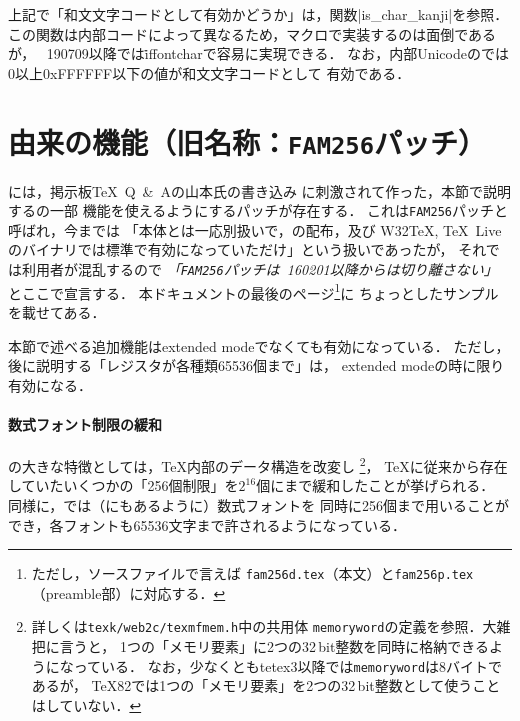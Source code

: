 \documentclass[a4paper,11pt,nomag,dvipdfmx]{jsarticle}
\begin{document}
\begin{dangerous}
  上記で「和文文字コードとして有効かどうか」は，関数|is_char_kanji|を参照．
  この関数は内部コードによって異なるため，マクロで実装するのは面倒であるが，
  \epTeX~190709以降では\.{iffontchar}で容易に実現できる．
  なお，内部Unicodeの\upTeX では0以上0xFFFFFF以下の値が和文文字コードとして
  有効である．%
\end{dangerous}


\section{\OMEGA 由来の機能（旧名称：\texttt{FAM256}パッチ）}
\epTeX には，掲示板\TeX\ Q\ \&\ Aの山本氏の書き込み
\cite{yamamoto}に刺激されて作った，本節で説明する\OMEGA の一部
機能を使えるようにするパッチが存在する．
これは\texttt{FAM256}パッチと呼ばれ，今までは
「\epTeX 本体とは一応別扱いで，\epTeX の配布，及び
W32\TeX, \TeX~Liveのバイナリでは標準で有効になっていただけ」という扱いであったが，
それでは利用者が混乱するので
\emph{「\texttt{FAM256}パッチは\epTeX~160201以降からは切り離さない」}
とここで宣言する．
本ドキュメントの最後のページ\footnote{ただし，ソースファイルで言えば
\texttt{fam256d.tex}（本文）と\texttt{fam256p.tex}（preamble部）に対応する．}に
ちょっとしたサンプルを載せてある．

本節で述べる追加機能はextended modeでなくても有効になっている．
ただし，後に説明する「レジスタが各種類65536個まで」は，
extended modeの時に限り有効になる．

\paragraph{数式フォント制限の緩和}
\OMEGA の大きな特徴としては，\TeX 内部のデータ構造を改変し
\footnote{詳しくは\texttt{texk/web2c/texmfmem.h}中の共用体%
\texttt{memoryword}の定義を参照．大雑把に言うと，
1つの「メモリ要素」に2つの32\,bit整数を同時に格納できるようになっている．
なお，少なくともtetex3以降では\texttt{memoryword}は8バイトであるが，
\TeX 82では1つの「メモリ要素」を2つの32\,bit整数として使うことはしていない．
}，
\TeX に従来から存在していたいくつかの「256個制限」を$2^{16}$個にまで緩和したことが挙げられる．
同様に，\OMEGA では（\cite{yamamoto}にもあるように）数式フォントを
同時に256個まで用いることができ，各フォントも65536文字まで許されるようになっている．

\medskip
\end{document}
